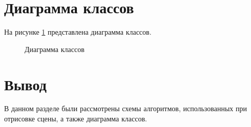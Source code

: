 \clearpage

\section{Диаграмма классов}

На рисунке \ref{fig:diag_class} представлена диаграмма классов.

\begin{figure}[ph!]
	\caption{Диаграмма классов}
	\label{fig:diag_class}
\end{figure}

\section*{Вывод}
В данном разделе были рассмотрены схемы алгоритмов, использованных при отрисовке сцены, а также диаграмма классов.


